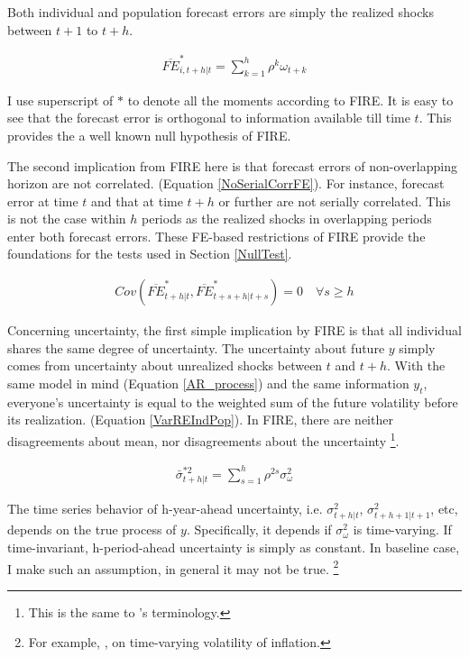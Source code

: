 \documentclass[12pt]{article}
\begin{document}
	Both individual and population forecast errors are simply the realized shocks between $t+1$ to $t+h$.  
	
	\begin{eqnarray}\label{NoPastInfFE}
		\overline{FE}^{*}_{i,t+h|t} = \sum^{h}_{k=1} \rho^k \omega_{t+k}
	\end{eqnarray}
	
	I use superscript of $*$ to denote all the moments according to FIRE. It is easy to see that the forecast error is orthogonal to information available till time $t$. This provides the a well known null hypothesis of FIRE.
	
	The second implication from FIRE here is that forecast errors of non-overlapping horizon are not correlated. (Equation \ref{NoSerialCorrFE}). For instance, forecast error at time $t$ and that at time $t+h$ or further are not serially correlated. This is not the case within $h$ periods as the realized shocks in overlapping periods enter both forecast errors.  These FE-based restrictions of FIRE provide the foundations for the tests used in Section \ref{NullTest}. 
	
	\begin{eqnarray}\label{NoSerialCorrFE}
		Cov(\overline{FE}^{*}_{t+h|t}, \overline{FE}^{*}_{t+s+h|t+s}) = 0 \quad \forall s \geq h
	\end{eqnarray}
	
	Concerning uncertainty, the first simple implication by FIRE is that all individual shares the same degree of uncertainty. The uncertainty about future $y$ simply comes from uncertainty about unrealized shocks between $t$ and $t+h$. With the same model in mind (Equation \ref{AR_process}) and the same information $y_t$, everyone's uncertainty is equal to the weighted sum of the future volatility before its realization. (Equation \ref{VarREIndPop}). In FIRE, there are neither disagreements about mean, nor disagreements about the uncertainty \footnote{This is the same to \citet{jurado2015measuring}'s terminology.}. 
	
	\begin{eqnarray}\label{VarREIndPop}
		\bar \sigma^{*2}_{t+h|t} = \sum^{h}_{s=1}\rho^{2s} \sigma^2_{\omega}
	\end{eqnarray}
	
	The time series behavior of h-year-ahead uncertainty, i.e. $\sigma^2_{t+h|t}$, $\sigma^2_{t+h+1|t+1}$, etc, depends on the true process of $y$. Specifically, it depends if $\sigma^2_\omega$ is time-varying. If time-invariant, h-period-ahead uncertainty is simply as constant. In baseline case, I make such an assumption, in general it may not be true. \footnote{For example, \citet{justiniano2008time}, \citet{vavra2013inflation} on time-varying volatility of inflation.} 
	
\end{document}
